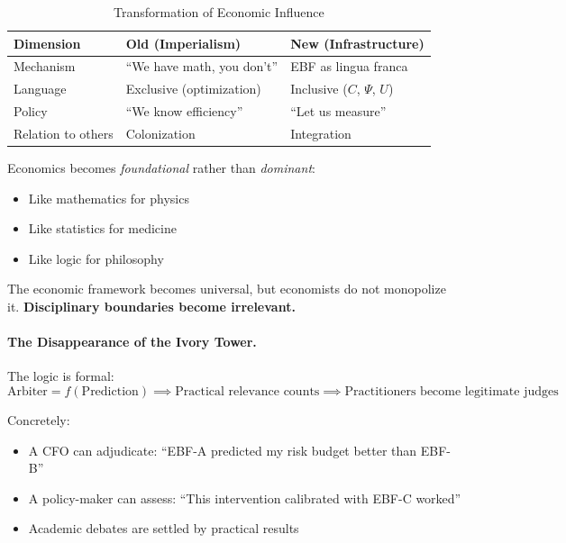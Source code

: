 \begin{table}[htbp]
\centering
\caption{Transformation of Economic Influence}
\label{tab:econ-influence}
\renewcommand{\arraystretch}{1.3}
\small
\begin{tabular}{@{}lll@{}}
\toprule
\textbf{Dimension} & \textbf{Old (Imperialism)} & \textbf{New (Infrastructure)} \\
\midrule
Mechanism & ``We have math, you don't'' & EBF as lingua franca \\
Language & Exclusive (optimization) & Inclusive ($C$, $\Psi$, $U$) \\
Policy & ``We know efficiency'' & ``Let us measure'' \\
Relation to others & Colonization & Integration \\
\bottomrule
\end{tabular}
\end{table}

Economics becomes \textit{foundational} rather than \textit{dominant}:
\begin{itemize}[nosep]
    \item Like mathematics for physics
    \item Like statistics for medicine
    \item Like logic for philosophy
\end{itemize}

The economic framework becomes universal, but economists do not monopolize it.
\textbf{Disciplinary boundaries become irrelevant.}

\paragraph{The Disappearance of the Ivory Tower.}

The logic is formal:
\begin{equation}
\text{Arbiter} = f(\text{Prediction}) \implies \text{Practical relevance counts}
\implies \text{Practitioners become legitimate judges}
\end{equation}

Concretely:
\begin{itemize}[nosep]
    \item A CFO can adjudicate: ``EBF-A predicted my risk budget better than EBF-B''
    \item A policy-maker can assess: ``This intervention calibrated with EBF-C worked''
    \item Academic debates are settled by practical results
\end{itemize}

